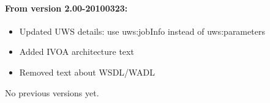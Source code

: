 \documentclass[11pt,a4paper]{ivoa}
\begin{document}
\begin{appendices}
\paragraph{From version 2.00-20100323:}
\begin{itemize}
    \item Updated UWS details: use uws:jobInfo instead of uws:parameters
    \item Added IVOA architecture text
    \item Removed text about WSDL/WADL
\end{itemize}

No previous versions yet.  

\end{appendices}


\end{document}
